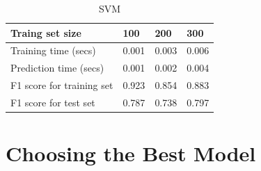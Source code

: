 \documentclass{article}
\begin{document}
\begin{table}[H]
\centering
\begin{tabular}{| l | l | l | l |}
\hline
Traing set size           & 100 & 200 & 300 \\
\hline
Training time (secs)      & 0.001 & 0.003 & 0.006 \\
\hline
Prediction time (secs)    & 0.001 & 0.002 & 0.004 \\
\hline
F1 score for training set & 0.923 & 0.854 & 0.883 \\
\hline
F1 score for test set     & 0.787 & 0.738 & 0.797 \\
\hline
\end{tabular}
\caption{SVM}
\end{table}

\color{black}

\section{Choosing the Best Model}
\end{document}
